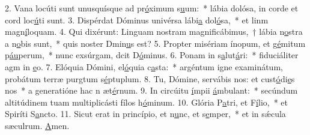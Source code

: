 2. Vana locúti sunt unusquísque ad pr\uline{ó}ximum s\uline{u}um:~* lábia dolósa, in corde et cord loc\uline{ú}ti sunt.
3. Dispérdat Dóminus univérsa lábi\uline{a} dol\uline{ó}sa,~* et linm magn\uline{í}loquam.
4. Qui dixérunt: Linguam nostram magnificábimus,~† lábia n\uline{o}stra a n\uline{o}bis sunt,~* quis noster Dmin\uline{u}s est?
5. Propter misériam ínopum, et g\uline{é}mitum p\uline{áu}perum,~* nunc exsúrgam, dcit D\uline{ó}minus.
6. Ponam in s\uline{a}lut\uline{á}ri:~* fiduciáliter agm in \uline{e}o.
7. Elóquia Dómini, el\uline{ó}quia c\uline{a}sta:~* argéntum igne examinátum, probátum terræ purgtum s\uline{é}ptuplum.
8. Tu, Dómine, servábis nos: et cust\uline{ó}di\uline{e}s nos~* a generatióne hac n æt\uline{é}rnum.
9. In circúitu \uline{í}mpii \uline{á}mbulant:~* secúndum altitúdinem tuam multiplicásti fílos h\uline{ó}minum.
10. Glória P\uline{a}tri, et F\uline{í}lio,~* et Spiríti S\uline{a}ncto.
11. Sicut erat in princípio, et n\uline{u}nc, et s\uline{e}mper,~* et in sǽcula sæculrum. \uline{A}men.
